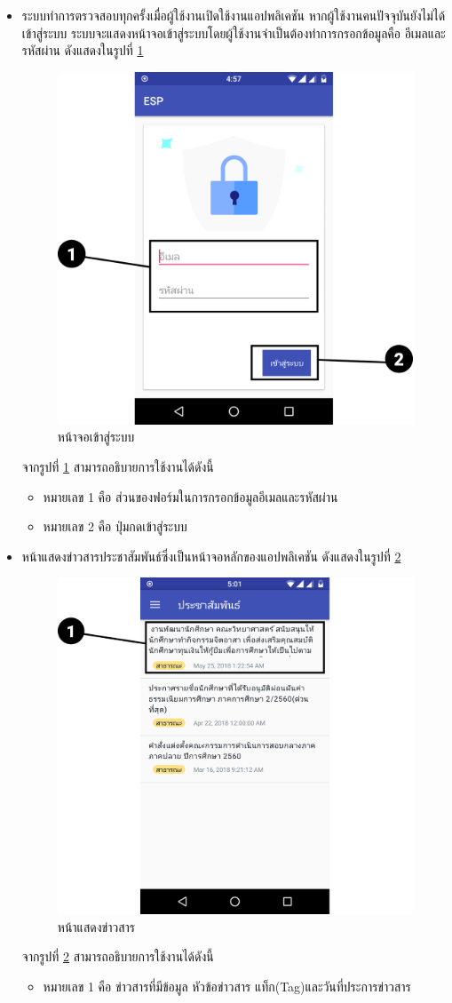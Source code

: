 \begin{enumerate}
\begin{itemize}
			\item ระบบทำการตรวจสอบทุกครั้งเมื่อผู้ใช้งานเปิดใช้งานแอปพลิเคชัน หากผู้ใช้งานคนปัจจุบันยังไม่ได้เข้าสู่ระบบ ระบบจะแสดงหน้าจอเข้าสู่ระบบโดยผู้ใช้งานจำเป็นต้องทำการกรอกข้อมูลคือ อีเมลและรหัสผ่าน ดังแสดงในรูปที่ \ref{Fig:signin}
			\begin{figure}[H]
				\centering
				\includegraphics[width=0.5\columnwidth]{Figures/7/Manual/signin}
				\caption{หน้าจอเข้าสู่ระบบ}
				\label{Fig:signin}
			\end{figure}
			จากรูปที่ \ref{Fig:signin} สามารถอธิบายการใช้งานได้ดังนี้
			\begin{itemize}[label={--}]
				\item หมายเลข 1 คือ ส่วนของฟอร์มในการกรอกข้อมูลอีเมลและรหัสผ่าน
				\item หมายเลข 2 คือ ปุ่มกดเข้าสู่ระบบ
			\end{itemize}
		
			\item หน้าแสดงข่าวสารประชาสัมพันธ์ซึ่งเป็นหน้าจอหลักของแอปพลิเคชัน ดังแสดงในรูปที่ \ref{Fig:feed}
			\begin{figure}[H]
				\centering
				\includegraphics[width=0.5\columnwidth]{Figures/7/Manual/feed}
				\caption{หน้าแสดงข่าวสาร}
				\label{Fig:feed}
			\end{figure}
			จากรูปที่ \ref{Fig:feed} สามารถอธิบายการใช้งานได้ดังนี้
			\begin{itemize}[label={--}]
				\item หมายเลข 1 คือ ข่าวสารที่มีข้อมูล หัวข้อข่าวสาร แท็ก(Tag)และวันที่ประการข่าวสาร
			\end{itemize}
		

\end{itemize}
\end{enumerate}
